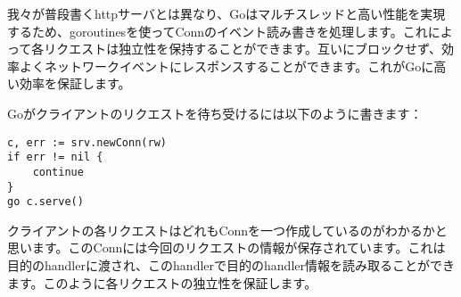 我々が普段書くhttpサーバとは異なり、Goはマルチスレッドと高い性能を実現するため、goroutinesを使ってConnのイベント読み書きを処理します。これによって各リクエストは独立性を保持することができます。互いにブロックせず、効率よくネットワークイベントにレスポンスすることができます。これがGoに高い効率を保証します。

Goがクライアントのリクエストを待ち受けるには以下のように書きます：

\begin{lstlisting}[numbers=none]
c, err := srv.newConn(rw)
if err != nil {
    continue
}
go c.serve()
\end{lstlisting}

クライアントの各リクエストはどれもConnを一つ作成しているのがわかるかと思います。このConnには今回のリクエストの情報が保存されています。これは目的のhandlerに渡され、このhandlerで目的のhandler情報を読み取ることができます。このように各リクエストの独立性を保証します。

